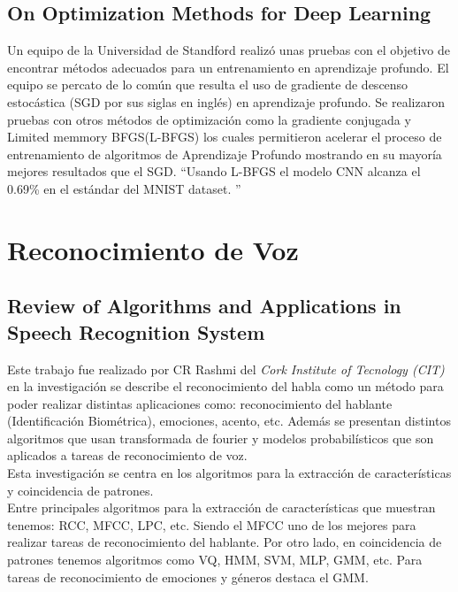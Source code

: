 \subsection{On Optimization Methods for Deep Learning}
Un equipo de la Universidad de Standford realizó unas pruebas con el objetivo de encontrar métodos adecuados para un entrenamiento en aprendizaje profundo. El equipo se percato de lo común que resulta el uso de gradiente de descenso estocástica (SGD por sus siglas en inglés) en aprendizaje profundo. Se realizaron pruebas con otros métodos de optimización como la gradiente conjugada y Limited memmory BFGS(L-BFGS) los cuales permitieron acelerar el proceso de entrenamiento de algoritmos de Aprendizaje Profundo mostrando en su mayoría mejores resultados que el SGD. \textquotedblleft Usando L-BFGS el modelo CNN alcanza el 0.69\%  en el estándar del MNIST dataset. \textquotedblright \cite{Optimization}


\section{Reconocimiento de Voz}
\subsection{Review of Algorithms and Applications in Speech Recognition System}
Este trabajo fue realizado por CR Rashmi del \textit{ Cork Institute of Tecnology (CIT) } en la investigación se describe el reconocimiento del habla como un método para poder realizar distintas aplicaciones como: reconocimiento del hablante (Identificación Biométrica), emociones, acento, etc. Además se presentan distintos algoritmos que usan transformada de fourier y modelos probabilísticos que son aplicados a tareas de reconocimiento de voz.\\ Esta investigación se centra en los algoritmos para la extracción de características y coincidencia de patrones.\\ Entre principales algoritmos para la extracción de características que muestran tenemos: RCC, MFCC, LPC, etc. Siendo el MFCC uno de los mejores para realizar tareas de reconocimiento del hablante. Por otro lado, en coincidencia de patrones tenemos algoritmos como VQ, HMM, SVM, MLP, GMM, etc. Para tareas de reconocimiento de emociones y géneros destaca el GMM.
